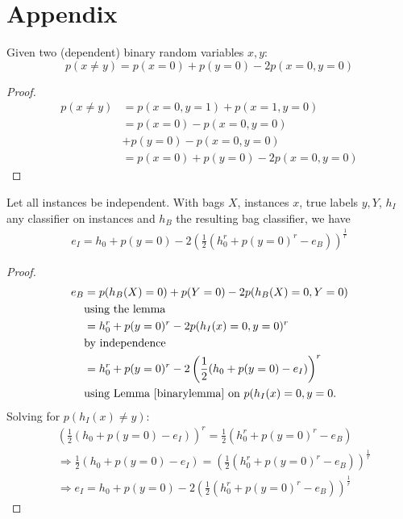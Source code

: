 
\section{Appendix}
\begin{lemma}\label{binarylemma}
Given two (dependent) binary random variables $x,y$:
\begin{equation}
p(x \neq y) = p(x=0) + p(y=0) - 2 p(x=0, y=0)
\end{equation}

\begin{proof}
\begin{align}
p(x \neq y) & = p(x=0, y=1) + p(x=1, y=0) \\
                &= p(x=0) - p(x=0, y=0)\\
                &  + p(y=0) - p(x=0, y=0) \\
                &= p(x=0) + p(y=0) -2 p(x=0, y=0)
\end{align}
\end{proof}
\end{lemma}

\begin{theorema}
Let all instances be independent. With bags $X$, instances $x$, true labels $y,Y$, $h_I$ any classifier
on instances and $h_B$ the resulting bag classifier, we have
\begin{align*}
   e_I = h_0 + p(y=0) - 2 \left (\frac{1}{2} ( h_0^r + p(y=0)^r - e_B) \right)^\frac{1}{r}
\end{align*}
\begin{proof}
    
\begin{align*}
e_B & = p(h_B(X) = 0) + p(Y=0) -2 p(h_B(X)=0, Y=0) \\\
&\text{using the lemma}\\
& = h_0^r + p(y=0)^r -2 p(h_I(x)=0, y=0)^r\\\
&\text{by independence}\\
& = h_0^r + p(y=0)^r -2 \left ( \frac{1}{2} (h_0 + p(y=0) - e_I) \right ) ^r \\
&\text{using Lemma~\ref{binarylemma} on }p(h_I(x)=0, y=0.
\end{align*}
Solving for $p(h_I(x)\neq y)$:
\begin{align*}
    & \left ( \frac{1}{2} (h_0 + p(y=0) - e_I )\right ) ^r = \frac{1}{2} \left ( h_0^r + p(y=0)^r - e_B \right )\\
    & \Rightarrow \frac{1}{2} (h_0 + p(y=0) - e_I)   = \left ( \frac{1}{2} \left ( h_0^r + p(y=0)^r - e_B \right ) \right )^\frac{1}{r}\\
    & \Rightarrow e_I   = h_0 + p(y=0) - 2 \left ( \frac{1}{2} \left ( h_0^r + p(y=0)^r - e_B \right ) \right )^\frac{1}{r}
\end{align*}
\end{proof}
\end{theorema}

